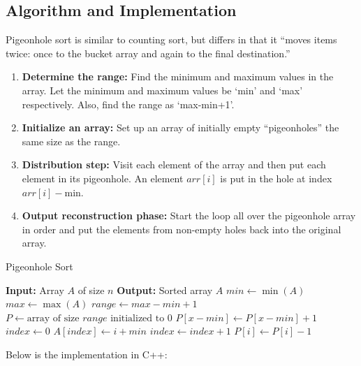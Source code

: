 \subsection{Algorithm and Implementation}

Pigeonhole sort is similar to counting sort, but differs in that it “moves items twice: once to the bucket array and again to the final destination.”

\begin{enumerate}
    \item \textbf{Determine the range:} Find the minimum and maximum values in the array. Let the minimum and maximum values be ‘min’ and ‘max’ respectively. Also, find the range as ‘max-min+1’.
    \item \textbf{Initialize an array:} Set up an array of initially empty “pigeonholes” the same size as the range.
    \item \textbf{Distribution step:} Visit each element of the array and then put each element in its pigeonhole. An element $arr[i]$ is put in the hole at index $arr[i] - \text{min}$.
    \item \textbf{Output reconstruction phase:} Start the loop all over the pigeonhole array in order and put the elements from non-empty holes back into the original array.
\end{enumerate}

\begin{algorithm}
    \caption{Pigeonhole Sort}
    \begin{algorithmic}[1]
        \State \textbf{Input:} Array $A$ of size $n$
        \State \textbf{Output:} Sorted array $A$
        \State $min \gets \min(A)$
        \State $max \gets \max(A)$
        \State $range \gets max - min + 1$
        \State $P \gets \text{array of size } range \text{ initialized to 0}$
            \State $P[x - min] \gets P[x - min] + 1$
        \EndFor
        \State $index \gets 0$
                \State $A[index] \gets i + min$
                \State $index \gets index + 1$
                \State $P[i] \gets P[i] - 1$
            \EndWhile
        \EndFor
        \EndFunction
    \end{algorithmic}
\end{algorithm}

Below is the implementation in C++:




